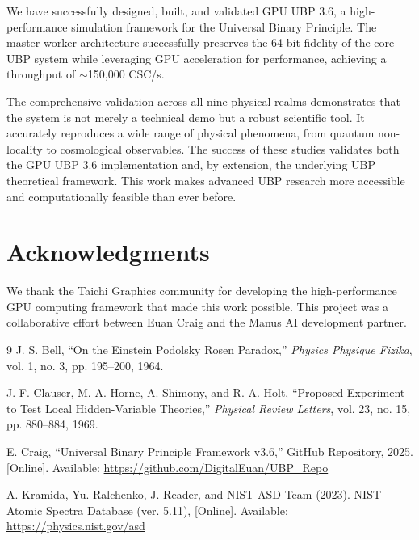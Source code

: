 \documentclass[12pt, a4paper]{article}
\begin{document}
We have successfully designed, built, and validated GPU UBP 3.6, a high-performance simulation framework for the Universal Binary Principle. The master-worker architecture successfully preserves the 64-bit fidelity of the core UBP system while leveraging GPU acceleration for performance, achieving a throughput of $\sim$150,000 CSC/s. 

The comprehensive validation across all nine physical realms demonstrates that the system is not merely a technical demo but a robust scientific tool. It accurately reproduces a wide range of physical phenomena, from quantum non-locality to cosmological observables. The success of these studies validates both the GPU UBP 3.6 implementation and, by extension, the underlying UBP theoretical framework. This work makes advanced UBP research more accessible and computationally feasible than ever before.

\section*{Acknowledgments}
We thank the Taichi Graphics community for developing the high-performance GPU computing framework that made this work possible. This project was a collaborative effort between Euan Craig and the Manus AI development partner.

\begin{thebibliography}{9}
    J. S. Bell, ``On the Einstein Podolsky Rosen Paradox,'' \textit{Physics Physique Fizika}, vol. 1, no. 3, pp. 195–200, 1964.
    
    J. F. Clauser, M. A. Horne, A. Shimony, and R. A. Holt, ``Proposed Experiment to Test Local Hidden-Variable Theories,'' \textit{Physical Review Letters}, vol. 23, no. 15, pp. 880–884, 1969.
    
    E. Craig, ``Universal Binary Principle Framework v3.6,'' GitHub Repository, 2025. [Online]. Available: \url{https://github.com/DigitalEuan/UBP_Repo}
    
    A. Kramida, Yu. Ralchenko, J. Reader, and NIST ASD Team (2023). NIST Atomic Spectra Database (ver. 5.11), [Online]. Available: \url{https://physics.nist.gov/asd}

\end{thebibliography}
\end{document}
